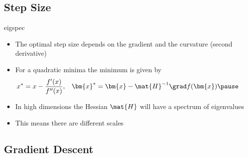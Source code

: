 \Outline %

\begin{slide}
\section[-2]{Step Size}

\begin{rightImage}{eigspec}
\begin{PauseHighLight}
  \begin{itemize}
  \item The optimal step size depends on the gradient and the
    curvature (second derivative)\pause
  \item For a quadratic minima the minimum is given by
    \begin{align*}
      x^* &= x - \frac{f'(x)}{f''(x)},
      &
      \bm{x}^* &= \bm{x} - \mat{H}^{-1} \grad f(\bm{x})\pause
    \end{align*}
  \item In high dimensions the Hessian $\mat{H}$ will have a spectrum
    of eigenvalues\pause
  \item This means there are different scales\pause
  \end{itemize}
\end{PauseHighLight}
  
\end{rightImage}

\end{slide}


\begin{slide}
\section{Gradient Descent}

\pb\pause{}
\begin{center}
  \pause
\end{center}
\end{slide}



